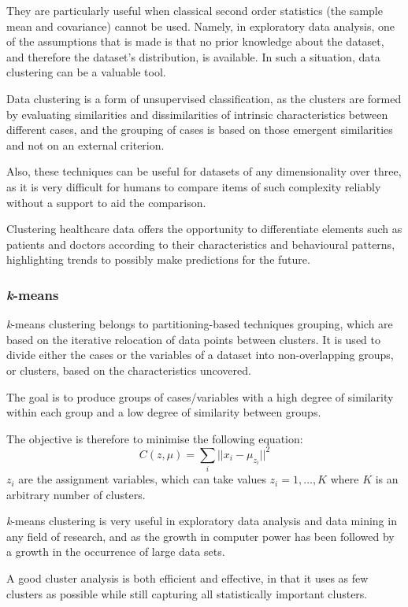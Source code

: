 They are particularly useful when classical second order statistics (the sample mean and covariance) cannot be used. Namely, in exploratory data analysis, one of the assumptions that is made is that no prior knowledge about the dataset, and therefore the dataset’s distribution, is available. In such a situation, data clustering can be a valuable tool. 

Data clustering is a form of unsupervised classification, as the clusters are formed by evaluating similarities and dissimilarities of intrinsic characteristics between different cases, and the grouping of cases is based on those emergent similarities and not on an external criterion. 

Also, these techniques can be useful for datasets of any dimensionality over three, as it is very difficult for humans to compare items of such complexity reliably without a support to aid the comparison\cite{kmeans}.

Clustering healthcare data offers the opportunity to differentiate elements such as patients and doctors according to their characteristics and behavioural patterns, highlighting trends to possibly make predictions for the future.

\subsubsection{\textit{k}-means}
\textit{k}-means clustering belongs to partitioning-based techniques grouping, which are based on the iterative relocation of data points between clusters. It is used to divide either the cases or the variables of a dataset into non-overlapping groups, or clusters, based on the characteristics uncovered\cite{kmeans}. 

The goal is to produce groups of cases/variables with a high degree of similarity within each group and a low degree of similarity between groups.

The objective is therefore to minimise the following equation:
$$C(z, \mu) = \sum_{i} ||x_i - \mu_{z_i}||^2$$
$z_i$ are the assignment variables, which can take values $z_i = 1, \dots, K$ where $K$ is an arbitrary number of clusters.

\textit{k}-means clustering is very useful in exploratory data analysis and data mining in any field of research, and as the growth in computer power has been followed by a growth in the occurrence of large data sets.
 
A good cluster analysis is both efficient and effective, in that it uses as few clusters as possible while still capturing all statistically important clusters.

